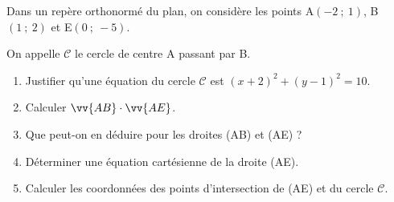 \medskip

Dans un repère orthonormé du plan, on considère les points A$(-2~;~1)$, B$(1~;~2)$ et
E$(0~;~-5)$. 

On appelle $\mathscr{C}$ le cercle de centre A passant par B.

\medskip

\begin{enumerate}
\item Justifier qu'une équation du cercle $\mathscr{C}$ est $(x + 2)^2 + (y - 1)^2 = 10.$
\item Calculer $\vv{AB}\cdot\vv{AE}$.
\item Que peut-on en déduire pour les droites (AB) et (AE) ?
\item Déterminer une équation cartésienne de la droite (AE).
\item Calculer les coordonnées des points d'intersection de (AE) et du cercle $\mathscr{C}$.
\end{enumerate}
